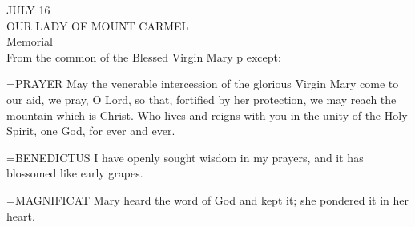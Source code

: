 \begin{center}\normalsize JULY 16\\
\footnotesize OUR LADY OF MOUNT CARMEL\\
\footnotesize Memorial\\
\footnotesize From the common of the Blessed Virgin Mary p    except:\\
\end{center}

\hangindent=\parindent \small{PRAYER 
May the venerable intercession of the glorious Virgin Mary
come to our aid, we pray, O Lord,
so that, fortified by her protection,
we may reach the mountain which is Christ.
Who lives and reigns with you in the unity of the Holy Spirit,
one God, for ever and ever.\\}
 
\hangindent=\parindent \small{BENEDICTUS  I have openly sought wisdom in my prayers, and it has
blossomed like early grapes.\\}
 
\hangindent=\parindent \small{MAGNIFICAT  Mary heard the word of God and kept it; she pondered
it in her heart.\\}
 
